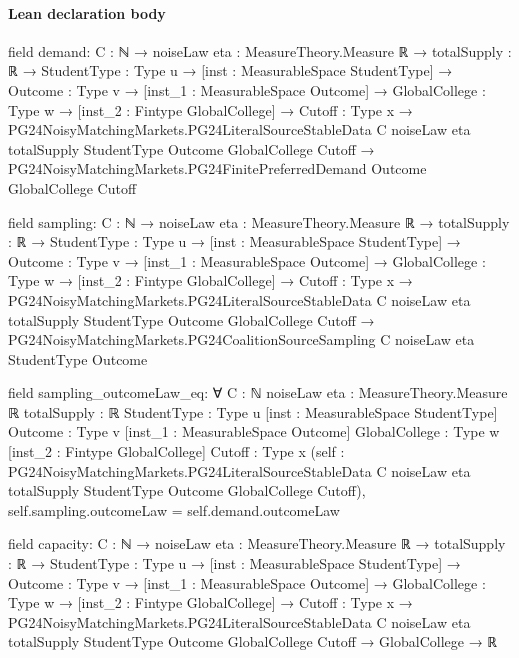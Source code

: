 \documentclass[10pt]{article}
\begin{document}
\paragraph{Lean declaration body}
\begin{ReviewVerbatim}
field demand:
{C : ℕ} →
  {noiseLaw eta : MeasureTheory.Measure ℝ} →
    {totalSupply : ℝ} →
      {StudentType : Type u} →
        [inst : MeasurableSpace StudentType] →
          {Outcome : Type v} →
            [inst_1 : MeasurableSpace Outcome] →
              {GlobalCollege : Type w} →
                [inst_2 : Fintype GlobalCollege] →
                  {Cutoff : Type x} →
                    PG24NoisyMatchingMarkets.PG24LiteralSourceStableData C noiseLaw eta totalSupply StudentType Outcome
                        GlobalCollege Cutoff →
                      PG24NoisyMatchingMarkets.PG24FinitePreferredDemand Outcome GlobalCollege Cutoff

field sampling:
{C : ℕ} →
  {noiseLaw eta : MeasureTheory.Measure ℝ} →
    {totalSupply : ℝ} →
      {StudentType : Type u} →
        [inst : MeasurableSpace StudentType] →
          {Outcome : Type v} →
            [inst_1 : MeasurableSpace Outcome] →
              {GlobalCollege : Type w} →
                [inst_2 : Fintype GlobalCollege] →
                  {Cutoff : Type x} →
                    PG24NoisyMatchingMarkets.PG24LiteralSourceStableData C noiseLaw eta totalSupply StudentType Outcome
                        GlobalCollege Cutoff →
                      PG24NoisyMatchingMarkets.PG24CoalitionSourceSampling C noiseLaw eta StudentType Outcome

field sampling_outcomeLaw_eq:
∀ {C : ℕ} {noiseLaw eta : MeasureTheory.Measure ℝ} {totalSupply : ℝ} {StudentType : Type u}
  [inst : MeasurableSpace StudentType] {Outcome : Type v} [inst_1 : MeasurableSpace Outcome] {GlobalCollege : Type w}
  [inst_2 : Fintype GlobalCollege] {Cutoff : Type x}
  (self :
    PG24NoisyMatchingMarkets.PG24LiteralSourceStableData C noiseLaw eta totalSupply StudentType Outcome GlobalCollege
      Cutoff),
  self.sampling.outcomeLaw = self.demand.outcomeLaw

field capacity:
{C : ℕ} →
  {noiseLaw eta : MeasureTheory.Measure ℝ} →
    {totalSupply : ℝ} →
      {StudentType : Type u} →
        [inst : MeasurableSpace StudentType] →
          {Outcome : Type v} →
            [inst_1 : MeasurableSpace Outcome] →
              {GlobalCollege : Type w} →
                [inst_2 : Fintype GlobalCollege] →
                  {Cutoff : Type x} →
                    PG24NoisyMatchingMarkets.PG24LiteralSourceStableData C noiseLaw eta totalSupply StudentType Outcome
                        GlobalCollege Cutoff →
                      GlobalCollege → ℝ


\end{ReviewVerbatim}
\end{document}
